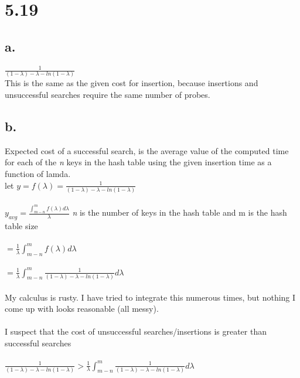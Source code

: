 \documentclass[12pt,letterpaper]{article}
\begin{document}
\section*{5.19} 
\subsection*{a.}
$\displaystyle \frac{1}{(1-\lambda)-\lambda - ln(1-\lambda)}$
\\This is the same as the given cost for insertion, because insertions and unsuccessful searches require the same number of probes.
\subsection*{b.}
Expected cost of a successful search, is the average value of the computed time for each of the \textit{n} keys in the hash table using the given insertion time as a function of lamda.\\
let $\displaystyle y = f(\lambda) = \frac{1}{(1-\lambda)-\lambda - ln(1-\lambda)}$\\\\
$\displaystyle y_{avg} = \frac{\int_{m-n}^m f(\lambda) d\lambda}{\lambda}$ \hspace*{.12 in} \scriptsize \textit{n} is the number of keys in the hash table and m is the hash table size\\\\
\small%
\hspace*{.3 in}$\displaystyle  = \frac{1}{\lambda} \int_{m-n}^m f(\lambda) d\lambda$\\\\
\hspace*{.3 in}$\displaystyle  = \frac{1}{\lambda} \int_{m-n}^m \frac{1}{(1-\lambda)-\lambda - ln(1-\lambda)} d\lambda$\\\\
My calculus is rusty. I have tried to integrate this numerous times, but nothing I come up with looks reasonable (all messy).\\\\
I suspect that the cost of unsuccessful searches/insertions is greater than successful searches\\\\
$\displaystyle \frac{1}{(1-\lambda)-\lambda - ln(1-\lambda)}  > \frac{1}{\lambda} \int_{m-n}^m \frac{1}{(1-\lambda)-\lambda - ln(1-\lambda)} d\lambda$
\newpage
\end{document}
